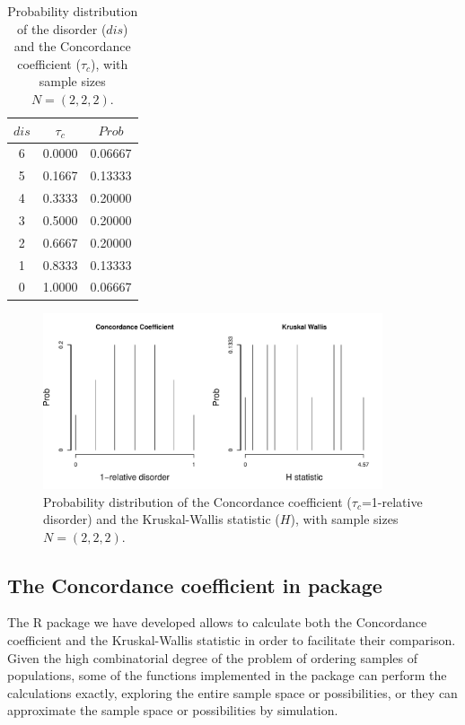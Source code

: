 \begin{table}[h] 	\centering\footnotesize
\begin{tabular}{ccc} 
    $dis$ & $\tau_c$   &$ Prob$           \\ \toprule
6	&	0.0000	&	0.06667\\ \cmidrule(l){1-3}
5	&	0.1667	&	0.13333	\\ \cmidrule(l){1-3}
4	&	0.3333	&	0.20000 	\\ \cmidrule(l){1-3}
3	&	0.5000	&	0.20000\\ \cmidrule(l){1-3}
2	&	0.6667	&	0.20000	\\ \cmidrule(l){1-3}
1	&	0.8333	&	0.13333	\\ \cmidrule(l){1-3}
0	&	1.0000	&	0.06667	\\ \bottomrule[0.2mm]
\end{tabular}
\caption{Probability distribution of the disorder ($dis$) and the Concordance coefficient ($\tau_c$), with sample sizes $N = (2,2,2)$.}
\label{t:prob_DK_222}
\end{table}

\begin{figure}[h]
\centering
\includegraphics[width=10cm]{CC_H_222.pdf}
\caption{\label{fig:distprob_222} Probability distribution of the Concordance coefficient ($\tau_c$=1-relative disorder) and the Kruskal-Wallis statistic ($H$), with sample sizes $N = (2,2,2)$.}
\end{figure}
\subsection{The Concordance coefficient in  package}

The R package we have developed allows to calculate both the Concordance coefficient and the Kruskal-Wallis statistic in order to facilitate their comparison. Given the high combinatorial degree of the problem of ordering samples of populations, some of the functions implemented in the package can perform the calculations exactly, exploring the entire sample space or possibilities, or they can approximate the sample space or possibilities by simulation.

